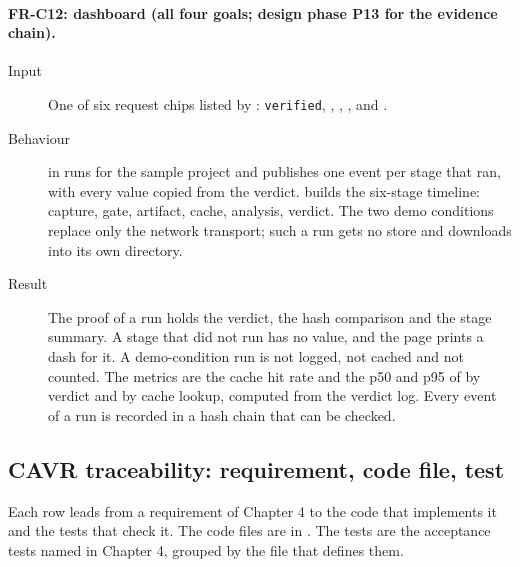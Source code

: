 \paragraph{FR-C12: dashboard (all four goals; design phase P13 for the evidence chain).}
\begin{sloppypar}
\begin{description}
    \item[Input] One of six request chips listed by : \texttt{verified}, , , ,  and .
    \item[Behaviour]  in  runs  for the sample project and publishes one event per stage that ran, with every value copied from the verdict.  builds the six-stage timeline: capture, gate, artifact, cache, analysis, verdict. The two demo conditions replace only the network transport; such a run gets no store and downloads into its own directory.
    \item[Result] The proof of a run holds the verdict, the hash comparison and the stage summary. A stage that did not run has no value, and the page prints a dash for it. A demo-condition run is not logged, not cached and not counted. The metrics are the cache hit rate and the p50 and p95 of  by verdict and by cache lookup, computed from the verdict log. Every event of a run is recorded in a hash chain that can be checked.
\end{description}
\end{sloppypar}

\subsection*{CAVR traceability: requirement, code file, test}
Each row leads from a requirement of Chapter 4 to the code that implements it and the tests that check it. The code files are in . The tests are the acceptance tests named in Chapter 4, grouped by the file that defines them.

